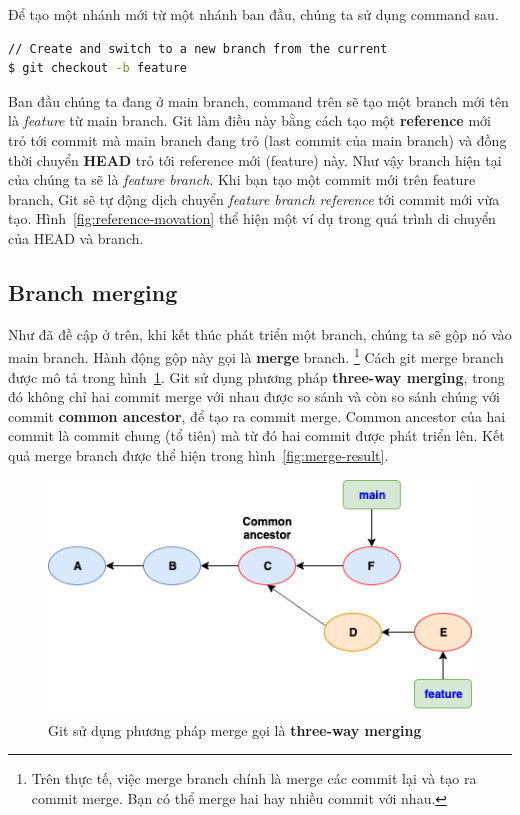 \documentclass[a4paper, 11pt]{article}
\begin{document}
Để tạo một nhánh mới từ một nhánh ban đầu, chúng ta sử dụng command sau.

 \begin{lstlisting}[language=bash]
 // Create and switch to a new branch from the current
$ git checkout -b feature
\end{lstlisting}

Ban đầu chúng ta đang ở main branch, command trên sẽ tạo một branch mới tên là \textit{feature} từ main branch. Git làm điều này bằng cách tạo một \textbf{reference} mới trỏ tới commit mà main branch đang trỏ (last commit của main branch) và đồng thời chuyển \textbf{HEAD} trỏ tới reference mới (feature) này. Như vậy branch hiện tại của chúng ta sẽ là \textit{feature branch}. Khi bạn tạo một commit mới trên feature branch, Git sẽ tự động dịch chuyển \textit{feature branch reference} tới commit mới vừa tạo. Hình~\ref{fig:reference-movation} thể hiện một ví dụ trong quá trình di chuyển của HEAD và branch.

\subsection{Branch merging} \label{merging}
Như đã đề cập ở trên, khi kết thúc phát triển một branch, chúng ta sẽ gộp nó vào main branch. Hành động gộp này gọi là \textbf{merge} branch. \footnote{Trên thực tế, việc merge branch chính là merge các commit lại và tạo ra commit merge. Bạn có thể merge hai hay nhiều commit với nhau.}  Cách git merge branch được mô tả trong hình~\ref{fig:three-way-merge}. Git sử dụng phương pháp \textbf{three-way merging}, trong đó không chỉ hai commit merge với nhau được so sánh và còn so sánh chúng với commit \textbf{common ancestor}, để tạo ra commit merge. Common ancestor của hai commit là commit chung (tổ tiên) mà từ đó hai commit được phát triển lên. Kết quả merge branch được thể hiện trong hình~\ref{fig:merge-result}.

\begin{figure}
\centering
\includegraphics[scale=0.6]{git-three-way-merge.png}
\caption{Git sử dụng phương pháp merge gọi là \textbf{three-way merging}}
\label{fig:three-way-merge}
\end{figure}
\end{document}
